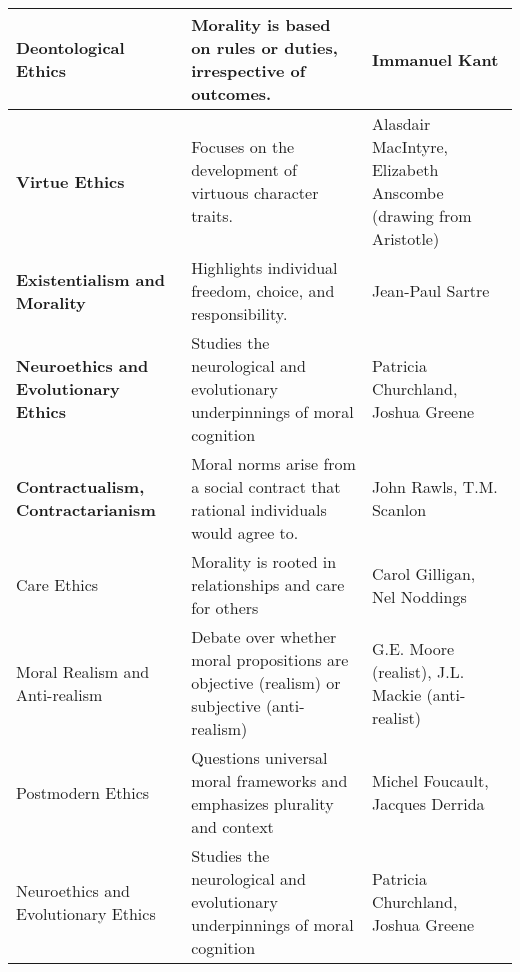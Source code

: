 \documentclass[12pt,a4]{article}
\begin{document}
\begin{table}
    \centering
    \begin{tabular}{p{3cm} p{5cm} p{4cm} } 
    \hline 
    \textbf{Deontological Ethics} 
        & Morality is based on rules or duties, irrespective of outcomes.
        & Immanuel Kant \\ \hline
    
    \textbf{Virtue Ethics} 
        & Focuses on the development of virtuous character traits. 
        & Alasdair MacIntyre, Elizabeth Anscombe (drawing from Aristotle)\\ \hline 
    
    \textbf{Existentialism and Morality} 
        & Highlights individual freedom, choice, and responsibility.
        & Jean-Paul Sartre\\ \hline 
        
    \textbf{Neuroethics and Evolutionary Ethics}
        & Studies the neurological and evolutionary underpinnings of moral cognition 
        & Patricia Churchland, Joshua Greene\\ \hline 
         
    \textbf{Contractualism, Contractarianism} 
        & Moral norms arise from a social contract that rational individuals
          would agree to.
        & John Rawls, T.M. Scanlon \\ \hline

        Care Ethics & Morality is rooted in relationships and care for others & Carol Gilligan, Nel Noddings \\ \hline

        Moral Realism and Anti-realism & Debate over whether moral propositions are objective (realism) or subjective (anti-realism) 
        & G.E. Moore (realist), J.L. Mackie (anti-realist) \\  \hline
        
        Postmodern Ethics & Questions universal moral frameworks and emphasizes plurality and context & 
        Michel Foucault, Jacques Derrida \\ \hline
        
        Neuroethics and Evolutionary Ethics & Studies the neurological and evolutionary underpinnings of moral cognition & Patricia Churchland, Joshua Greene \\ 
    \hline

    \end{tabular}
    
\end{table}
\end{document}
